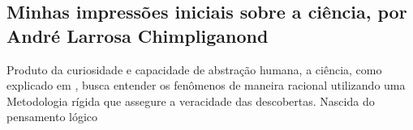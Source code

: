 \subsection{Minhas impressões iniciais sobre a ciência, por André Larrosa Chimpliganond}

Produto da curiosidade e capacidade de abstração humana, a ciência, como explicado em \cite{aranha_temas_2009}, busca entender os fenômenos de maneira racional utilizando uma \gls{Metodologia} rígida que assegure a veracidade das descobertas.
Nascida do pensamento lógico 
